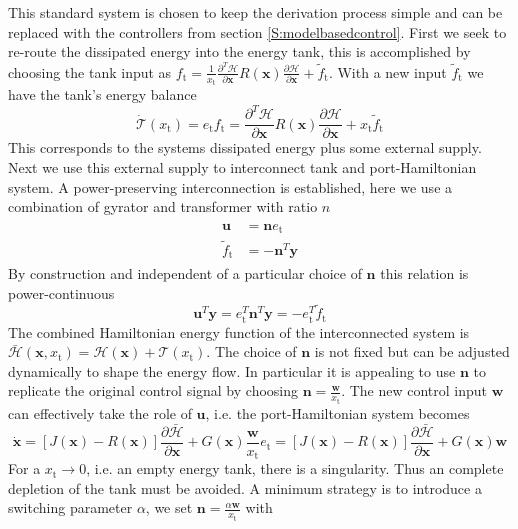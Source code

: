 \documentclass[a4paper,twoside, openright,12pt]{report}
\newcommand{\f}[1]{\boldsymbol{#1}}
\newcommand{\g}[1]{\text{#1}}
\begin{document}
This standard system is chosen to keep the derivation process simple and can be replaced with the controllers from section \ref{S:modelbasedcontrol}.
First we seek to re-route the dissipated energy into the energy tank, this is accomplished by choosing the tank input as $f_\g{t} = \frac{1}{x_\g{t}}\frac{\partial^T \mathcal{H}}{\partial \f{x}}R(\f{x})\frac{\partial \mathcal{H}}{\partial \f{x}} + \tilde{f}_\g{t}$. With a new input $\tilde{f}_\g{t}$ we have the tank's energy balance
\begin{equation}\label{EQ:tankpower}
\dot{\mathcal{T}}(x_\g{t})=e_\g{t}f_\g{t} = \frac{\partial^T \mathcal{H}}{\partial \f{x}}R(\f{x})\frac{\partial \mathcal{H}}{\partial \f{x}} + x_\g{t}\tilde{f}_\g{t}
\end{equation}
This corresponds to the systems dissipated energy plus some external supply. Next we use this external supply to interconnect tank and port-Hamiltonian system. A power-preserving interconnection is established, here we use a combination of gyrator and transformer with ratio $n$
\begin{eqnarray}
\begin{aligned}
\f{u} &= \f{n}e_\g{t} \\
\tilde{f}_\g{t} &= -\f{n}^T\f{y}
\end{aligned}
\end{eqnarray}
By construction and independent of a particular choice of $\f{n}$ this relation is power-continuous
\begin{equation}
\f{u}^T\f{y} = e_\g{t}^T\f{n}^T\f{y} = -e_\g{t}^T\tilde{f}_\g{t}
\end{equation}
The combined Hamiltonian energy function of the interconnected system is $\bar{\mathcal{H}}(\f{x},x_\g{t})=\mathcal{H}(\f{x})+\mathcal{T}(x_\g{t})$. The choice of $\f{n}$ is not fixed but can be adjusted dynamically to shape the energy flow. In particular it is appealing to use $\f{n}$ to replicate the original control signal by choosing $\f{n} = \frac{\f{w}}{x_\g{t}}$. The new control input $\f{w}$ can effectively take the role of $\f{u}$, i.e. the port-Hamiltonian system becomes
\begin{equation}
\dot{\f{x}} = [J(\f{x}) - R(\f{x})] \frac{\partial \bar{\mathcal{H}}}{\partial \f{x}} + G(\f{x})\frac{\f{w}}{x_\g{t}}e_\g{t} = [J(\f{x}) - R(\f{x})] \frac{\partial \bar{\mathcal{H}}}{\partial \f{x}} + G(\f{x})\f{w}
\end{equation}
For a $x_\g{t}\rightarrow0$, i.e. an empty energy tank, there is a singularity. Thus an complete depletion of the tank must be avoided. A minimum strategy is to introduce a switching parameter $\alpha$, we set $\f{n}=\frac{\alpha \f{w}}{x_\g{t}}$ with 
\end{document}
